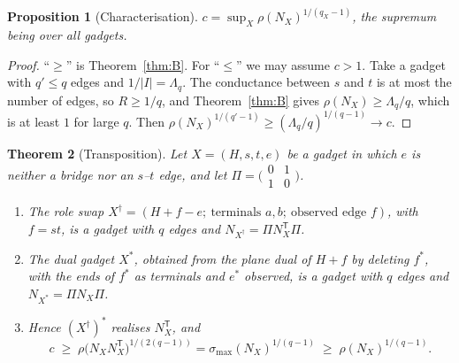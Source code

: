 \documentclass[11pt]{amsart}
\theoremstyle{plain}
\newtheorem{theorem}{Theorem}
\newtheorem{proposition}[theorem]{Proposition}
\theoremstyle{definition}
\theoremstyle{remark}
\newcommand{\T}{\mathsf{T}}
\newcommand{\Lam}{\Lambda}
\begin{document}
\begin{proposition}[Characterisation]\label{prop:A}
$c=\sup_X\rho(N_X)^{1/(q_X-1)}$, the supremum being over all gadgets.
\end{proposition}
\begin{proof}
``$\ge$'' is Theorem~\ref{thm:B}. For ``$\le$'' we may assume $c>1$. Take a gadget with $q'\le q$ edges and
$1/|I|=\Lam_q$. The conductance between $s$ and $t$ is at most the number of edges, so $R\ge1/q$, and
Theorem~\ref{thm:B} gives $\rho(N_X)\ge\Lam_q/q$, which is at least $1$ for large $q$. Then
$\rho(N_X)^{1/(q'-1)}\ge(\Lam_q/q)^{1/(q-1)}\to c$.
\end{proof}

\begin{theorem}[Transposition]\label{thm:C}
Let $X=(H,s,t,e)$ be a gadget in which $e$ is neither a bridge nor an $s$--$t$ edge, and let
$\Pi=\bigl(\begin{smallmatrix}0&1\\1&0\end{smallmatrix}\bigr)$.
\begin{enumerate}
\item The \emph{role swap} $X^\dagger=(H+f-e;\ \text{terminals } a,b;\ \text{observed edge } f)$, with $f=st$, is a
  gadget with $q$ edges and $N_{X^\dagger}=\Pi N_X^{\T}\Pi$.
\item The \emph{dual gadget} $X^\ast$, obtained from the plane dual of $H+f$ by deleting $f^\ast$, with the ends of
  $f^\ast$ as terminals and $e^\ast$ observed, is a gadget with $q$ edges and $N_{X^\ast}=\Pi N_X\Pi$.
\item Hence $(X^\dagger)^\ast$ realises $N_X^{\T}$, and
\[
c\;\ge\;\rho\bigl(N_XN_X^{\T}\bigr)^{1/(2(q-1))}=\sigma_{\max}(N_X)^{1/(q-1)}\;\ge\;\rho(N_X)^{1/(q-1)} .
\]
\end{enumerate}
\end{theorem}
\end{document}
